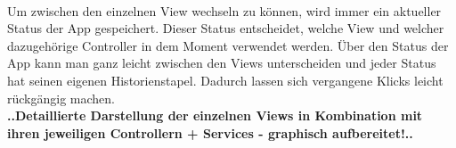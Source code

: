 \\
Um zwischen den einzelnen View wechseln zu können, wird immer ein aktueller Status der App gespeichert. Dieser Status entscheidet, welche View und welcher dazugehörige Controller in dem Moment verwendet werden. Über den Status der App kann man ganz leicht zwischen den Views unterscheiden und jeder Status hat seinen eigenen Historienstapel. Dadurch lassen sich vergangene Klicks leicht rückgängig machen.
\\
\textbf{..Detaillierte Darstellung der einzelnen Views in Kombination mit ihren jeweiligen Controllern + Services - graphisch aufbereitet!..}